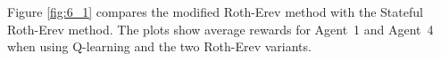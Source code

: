 
Figure \ref{fig:6_1} compares the modified Roth-Erev method with the Stateful
Roth-Erev method.  The plots show average rewards for Agent~1 and Agent~4 when
using Q-learning and the two Roth-Erev variants.

